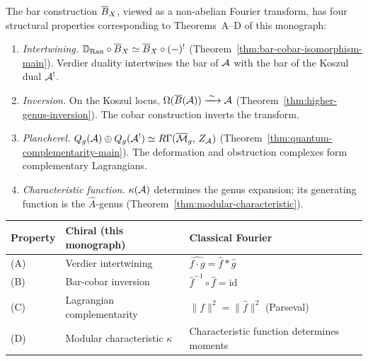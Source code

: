 \begin{theorem}
\label{thm:fourier-four-properties}
The bar construction $\overline{B}_X$, viewed as a non-abelian Fourier
transform, has four structural properties corresponding to
Theorems~A--D of this monograph:
\begin{enumerate}[label=\textup{(\Alph*)}]
\item \emph{Intertwining.}
  $\mathbb{D}_{\operatorname{Ran}} \circ \overline{B}_X \simeq
  \overline{B}_X \circ (-)^!$
  \textup{(}Theorem~\ref{thm:bar-cobar-isomorphism-main}\textup{)}.
  Verdier duality intertwines the bar of $\mathcal{A}$ with the bar of the
  Koszul dual $\mathcal{A}^!$.
\item \emph{Inversion.}
  On the Koszul locus,
  $\Omega(\overline{B}(\mathcal{A})) \xrightarrow{\;\sim\;} \mathcal{A}$
  \textup{(}Theorem~\ref{thm:higher-genus-inversion}\textup{)}.
  The cobar construction inverts the transform.
\item \emph{Plancherel.}
  $Q_g(\mathcal{A}) \oplus Q_g(\mathcal{A}^!) \simeq
  R\Gamma(\overline{\mathcal{M}}_g,\, Z_{\mathcal{A}})$
  \textup{(}Theorem~\ref{thm:quantum-complementarity-main}\textup{)}.
  The deformation and obstruction complexes form complementary
  Lagrangians.
\item \emph{Characteristic function.}
  $\kappa(\mathcal{A})$ determines the genus expansion; its generating
  function is the $\hat{A}$-genus
  \textup{(}Theorem~\ref{thm:modular-characteristic}\textup{)}.
\end{enumerate}
\end{theorem}

\begin{remark}
\label{rem:fourier-classical-analogues}
\begin{center}
\small
\begin{tabular}{lll}
\textbf{Property}
  & \textbf{Chiral (this monograph)}
  & \textbf{Classical Fourier} \\
\hline
(A) & Verdier intertwining
  & $\widehat{f \cdot g} = \hat{f} * \hat{g}$ \\
(B) & Bar-cobar inversion
  & $\hat{f}^{-1} \circ \hat{f} = \mathrm{id}$ \\
(C) & Lagrangian complementarity
  & $\|f\|^2 = \|\hat{f}\|^2$ (Parseval) \\
(D) & Modular characteristic $\kappa$
  & Characteristic function determines moments
\end{tabular}
\end{center}
\end{remark}


